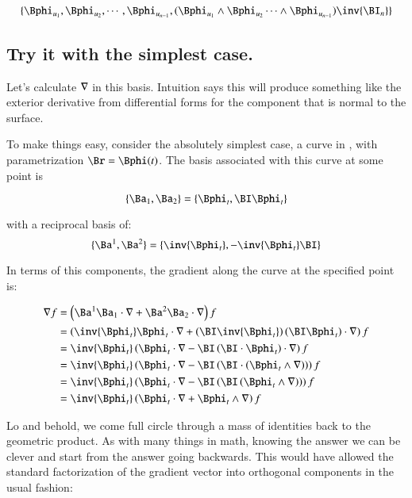 \[
\{ \Bphi_{u_1}, \Bphi_{u_2}, \cdots, \Bphi_{u_{n-1}}, 
(\Bphi_{u_1} \wedge \Bphi_{u_2} \cdots \wedge \Bphi_{u_{n-1}}) \inv{\BI_n}
 \}
\]

\subsection{Try it with the simplest case. }

Let's calculate $\nabla$ in this basis.  Intuition says this will
produce something like the exterior derivative from differential forms
for the component that is normal to the surface.

To make things easy, consider the absolutely simplest case, a curve
in , with parametrization $\Br = \Bphi(t)$.  The basis associated
with this curve at some point is

\[
\{ \Ba_1, \Ba_2 \} = \{ \Bphi_t, \BI \Bphi_t \}
\]

with a reciprocal basis of:
\[
\{ \Ba^1, \Ba^2 \} = \{ \inv{\Bphi_t}, -\inv{\Bphi_t} \BI \}
\]

In terms of this components, the gradient along the curve at the specified
point is:

\begin{align*}
\grad f
&= \left(\Ba^1 \Ba_1 \cdot \grad +\Ba^2 \Ba_2 \cdot \grad \right) f \\
&= \left(\inv{\Bphi_t} \Bphi_t \cdot \grad + \left( \BI \inv{\Bphi_t} \right) \left(\BI \Bphi_t \right) \cdot \grad \right) f \\
&= \inv{\Bphi_t}\left(\Bphi_t \cdot \grad -\BI \left(\BI \cdot \Bphi_t \right) \cdot \grad \right) f \\
&= \inv{\Bphi_t}\left(\Bphi_t \cdot \grad -\BI \left(\BI \cdot \left(\Bphi_t \wedge \grad \right) \right) \right) f \\
&= \inv{\Bphi_t}\left(\Bphi_t \cdot \grad -\BI \left(\BI \left(\Bphi_t \wedge \grad \right) \right) \right) f \\
&= \inv{\Bphi_t}\left(\Bphi_t \cdot \grad + \Bphi_t \wedge \grad \right) f \\
\end{align*}

Lo and behold, we come full circle through a mass of identities back to the geometric product.
As with many things in math, knowing the answer we can be clever and start from the answer going backwards.  This would have allowed the standard factorization of the gradient vector into 
orthogonal components in the usual fashion:

